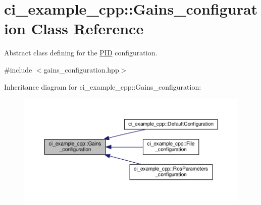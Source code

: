 \hypertarget{classci__example__cpp_1_1Gains__configuration}{}\section{ci\+\_\+example\+\_\+cpp\+:\+:Gains\+\_\+configuration Class Reference}
\label{classci__example__cpp_1_1Gains__configuration}


Abstract class defining for the \hyperlink{classci__example__cpp_1_1PID}{P\+ID} configuration.  




{\ttfamily \#include $<$gains\+\_\+configuration.\+hpp$>$}



Inheritance diagram for ci\+\_\+example\+\_\+cpp\+:\+:Gains\+\_\+configuration\+:
\nopagebreak
\begin{figure}[H]
\begin{center}
\leavevmode
\includegraphics[width=350pt]{classci__example__cpp_1_1Gains__configuration__inherit__graph}
\end{center}
\end{figure}
